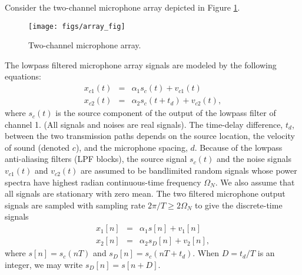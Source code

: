 \documentclass[12pt]{report}
\begin{document}
Consider the two-channel microphone array depicted in Figure \ref{fig:array_fig}.
\begin{figure}[!htb]
	\centering
    \texttt{[image: figs/array\_fig]}
    \caption{Two-channel microphone array. \label{fig:array_fig}}
    \end{figure}
The lowpass filtered microphone array signals are modeled by the following equations:
\begin{subequations}
\begin{eqnarray}
x_{c1}(t)&=&\alpha_1 s_c(t)+v_{c1}(t) \label{eq:1a} \\
x_{c2}(t)&=&\alpha_2 s_c(t+t_d)+v_{c2}(t), \label{eq:1b}
\end{eqnarray}
\end{subequations}
where $s_{c}(t)$ is the source component of the output of the lowpass filter of channel 1. (All signals and noises are real signals). The time-delay difference, $t_{d}$, between the two transmission paths depends on the source location, the velocity of sound (denoted $c$), and the microphone spacing, $d$. Because of the lowpass anti-aliasing filters (LPF blocks), the source signal $s_c(t)$ and the noise signals $v_{c1}(t)$ and $v_{c2}(t)$ are assumed to be bandlimited random signals whose power spectra have highest radian continuous-time frequency $\Omega_N$. We also assume that all signals are stationary with zero mean. The two filtered microphone output signals are sampled with sampling rate $2\pi/T\geq 2\Omega_N$ to give the discrete-time signals
\begin{subequations}
\begin{eqnarray}
x_{1}[n]&=&\alpha_1 s[n]+v_1[n] \label{eq:2a} \\
x_{2}[n]&=&\alpha_2 s_D[n]+v_{2}[n], \label{eq:2b}
\end{eqnarray}
\end{subequations}
where $s[n]=s_c(nT)$ and $s_D[n]=s_{c}(nT+t_d)$.  When $D=t_d/T$  is an integer, we may write $s_D[n]=s[n+D]$.
\end{document}
